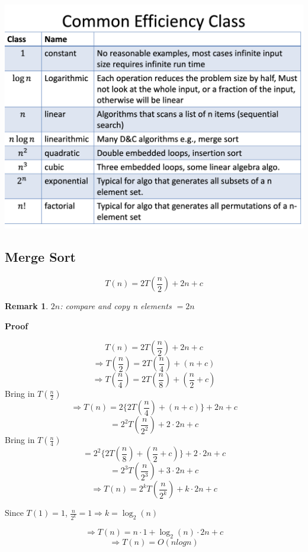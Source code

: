 \documentclass[12pt,a4paper]{article}
\newtheorem*{rem}{Remark}
\newcommand{\Remark}[1]{
  \begin{rem}
    \color{cyan}
    #1
  \end{rem}
}
\begin{document}
\includegraphics[width=\textwidth]{./images/common_efficiency_class.png}

\subsection*{Merge Sort}

\[T(n) = 2T(\frac{n}{2}) + 2n + c\]

\Remark{$2n$: compare and copy n elements $= 2n$}

\textbf{Proof}

\[T(n) = 2T(\frac{n}{2}) + 2n + c\]
\[\Rightarrow T(\frac{n}{2}) = 2T(\frac{n}{4}) + (n + c)\]
\[\Rightarrow T(\frac{n}{4}) = 2T(\frac{n}{8}) + (\frac{n}{2} + c)\] Bring in $T(\frac{n}{2})$
\[\Rightarrow T(n) = 2\{2T(\frac{n}{4}) + (n + c)\} + 2n + c\]
\[= 2^2T(\frac{n}{2^2}) + 2 \cdot 2n + c\] Bring in $T(\frac{n}{4})$
\[= 2^2\{2T(\frac{n}{8}) + (\frac{n}{2} + c)\} + 2 \cdot 2n + c\]
\[= 2^3T(\frac{n}{2^3}) + 3 \cdot 2n + c\]
\[\Rightarrow T(n)= 2^kT(\frac{n}{2^k}) + k \cdot 2n + c\]

Since $T(1) = 1$, $\frac{n}{2^k} = 1 \Rightarrow k = \log_2(n)$

\[\Rightarrow T(n) = n \cdot 1 + \log_2(n) \cdot 2n + c\]
\[\Rightarrow T(n) = O(nlogn) \]
\end{document}
